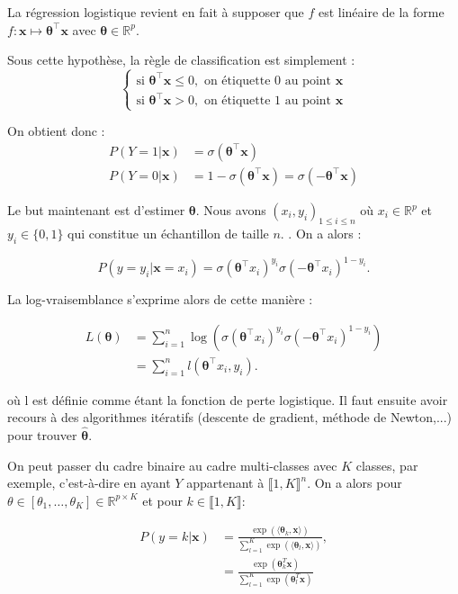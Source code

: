 \documentclass{article}
\begin{document}
La régression logistique revient en fait à supposer que \( f \) est linéaire de la forme \( f : \bm{x} \mapsto \bm{\theta}^\top \bm{x} \) avec \( \bm{\theta} \in \mathbb{R}^p \).


Sous cette hypothèse, la règle de classification est simplement :
\[
\begin{cases}
\text{si } \bm{\theta}^\top \bm{x}\leq 0 , \text{ on étiquette 0 au point } \bm{x} \\
\text{si } \bm{\theta}^\top \bm{x} > 0, \text{ on étiquette 1 au point } \bm{x}
\end{cases}
\]

On obtient donc :
\begin{align*}
    P(Y=1|\bm{x}) &= \sigma(\bm{\theta}^\top \bm{x}) \\
    P(Y=0|\bm{x}) &= 1- \sigma(\bm{\theta}^\top \bm{x}) = \sigma(-\bm{\theta}^\top \bm{x})
\end{align*}

Le but maintenant est d'estimer $\bm{\theta}$. Nous avons $(x_i, y_i)_{1 \leq i \leq n}$  où \(x_i \in \mathbb{R}^p\) et \(y_i \in \{0,1\}\) qui constitue un échantillon de taille \(n\).
. On a alors :

\[ P(y = y_i | \bm{x} = x_i) = \sigma(\bm{\theta}^\top x_i)^{y_i} \sigma(-\bm{\theta}^\top x_i)^{1-y_i}. \]

La log-vraisemblance s'exprime alors de cette manière :

\begin{align*}
    L(\bm{\theta}) &= \sum_{i=1}^{n} \log\left( \sigma(\bm{\theta}^\top x_i)^{y_i} \sigma(-\bm{\theta}^\top x_i)^{1-y_i} \right) \\
                   &= \sum_{i=1}^{n} l(\bm{\theta}^\top x_i, y_i).
\end{align*}

où l est définie comme étant la fonction de perte logistique. Il faut ensuite  avoir recours à des algorithmes itératifs (descente de gradient, méthode de Newton,...) pour trouver  $\bm{\hat{\theta}}$.

On peut passer du cadre binaire au cadre multi-classes avec \(K\) classes, par exemple, c'est-à-dire en ayant \(Y\) appartenant à \(\llbracket 1, K \rrbracket^{n}\).
On a alors pour \(\theta \in [\theta_1, \ldots, \theta_K] \in \mathbb{R}^{p\times K}\) et pour \(k \in \llbracket 1, K \rrbracket\):

\begin{align*}
    P(y=k | \bm{x}) &= \frac{\exp(\langle \boldsymbol{\theta}_k, \bm{x} \rangle)}{\sum_{l=1}^{K} \exp(\langle \boldsymbol{\theta}_l, \bm{x} \rangle)}, \\
    &= \frac{\exp(\boldsymbol{\theta}_k^T \bm{x})}{\sum_{l=1}^{K} \exp(\boldsymbol{\theta}_l^T \bm{x})}
\end{align*}
\end{document}

